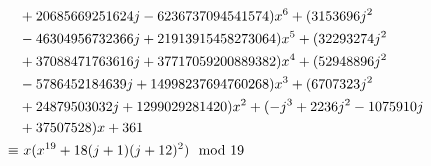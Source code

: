 \documentclass{rs}
\theoremstyle{definition}
\theoremstyle{remark}
\newcommand{\md}{~~{\rm mod}~}
\renewcommand{\=}{\approx}
\renewcommand{\-}{\sim}
\numberwithin{equation}{section}
\numberwithin{thm}{section}
\begin{document}
\begin{equation*}
\begin{split}
                   & +20685669251624 j-6236737094541574) x^6+(3153696 j^2 \\
                   & -46304956732366 j+21913915458273064) x^5+(32293274 j^2 \\
                   & +37088471763616 j+37717059200889382) x^4+(52948896 j^2 \\
                   & -5786452184639 j+14998237694760268) x^3+(6707323 j^2 \\
                   & +24879503032 j+1299029281420) x^2+(-j^3+2236 j^2-1075910 j \\
                   & +37507528) x+361 \\
            \equiv & ~ x (x^{19} + 18 (j + 1) (j + 12)^2) \md 19 
   \end{split}
  \end{equation*}
\end{document}
